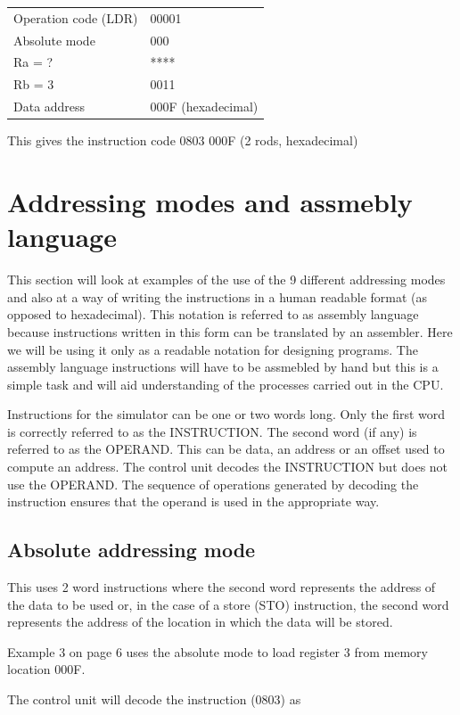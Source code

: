 \documentclass{article}
\begin{document}
\begin{tabular}{ m{4cm} m{4cm} }
    Operation code (LDR) & 00001 \\ 
    Absolute mode & 000 \\  
    Ra = ? & **** \\
    Rb = 3 & 0011 \\
    Data address & 000F (hexadecimal)
\end{tabular}

This gives the instruction code 0803 000F (2 rods, hexadecimal)

\section{Addressing modes and assmebly language}

This section will look at examples of the use of the 9 different addressing modes and also at a way of writing the instructions in a human readable format (as opposed to hexadecimal). This notation is referred to as assembly language because instructions written in this form can be translated by an assembler. Here we will be using it only as a readable notation for designing programs. The assembly language instructions will have to be assmebled by hand but this is a simple task and will aid understanding of the processes carried out in the CPU.

Instructions for the simulator can be one or two words long. Only the first word is correctly referred to as the INSTRUCTION. The second word (if any) is referred to as the OPERAND. This can be data, an address or an offset used to compute an address. The control unit decodes the INSTRUCTION but does not use the OPERAND. The sequence of operations generated by decoding the instruction ensures that the operand is used in the appropriate way.

\subsection{Absolute addressing mode}

This uses 2 word instructions where the second word represents the address of the data to be used or, in the case of a store (STO) instruction, the second word represents the address of the location in which the data will be stored.

Example 3 on page 6 uses the absolute mode to load register 3 from memory location 000F.

The control unit will decode the instruction (0803) as
\end{document}
